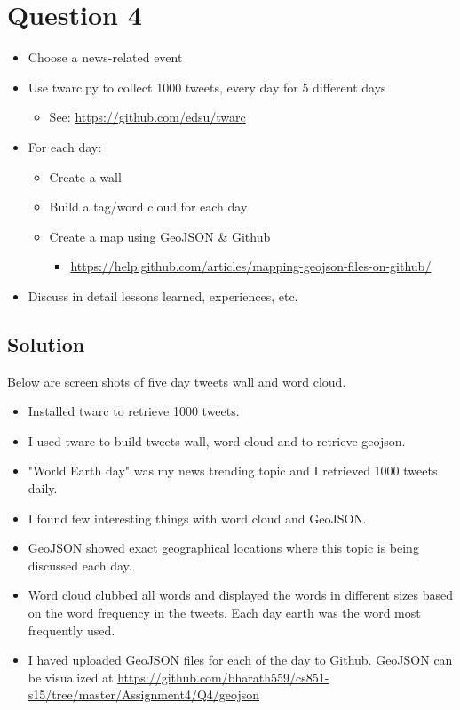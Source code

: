 


\section{Question 4}
\label{part1}

\begin{itemize}
\item Choose a news-related event
\item Use twarc.py to collect 1000 tweets, every day for 5 different days
\begin{itemize}
\item See: \url {https://github.com/edsu/twarc}
\end{itemize}
\item For each day:
\begin{itemize}
\item Create a wall
\item Build a tag/word cloud for each day
\item Create a map using GeoJSON \& Github
\begin{itemize}
\item \url {https://help.github.com/articles/mapping-geojson-files-on-github/} 
\end{itemize}
\end{itemize}
\item Discuss in detail lessons learned, experiences, etc.
\end{itemize}
\subsection{Solution}

Below are screen shots of five day tweets wall and word cloud.


\begin{itemize}
	\item Installed twarc\cite{twarc} to retrieve 1000 tweets.
	\item I used twarc to build tweets wall, word cloud and to retrieve geojson.
	\item "World Earth day" was my news trending topic and I retrieved 1000 tweets daily.
	\item I found few interesting things with word cloud and GeoJSON. 
	\item GeoJSON showed exact geographical locations where this topic is being discussed each day.
	\item Word cloud clubbed all words and displayed the words in different sizes based on the word frequency in the tweets. Each day earth was the word most frequently used.
	\item I haved uploaded GeoJSON files for each of the day to Github. GeoJSON can be visualized at \url{https://github.com/bharath559/cs851-s15/tree/master/Assignment4/Q4/geojson} 
\end{itemize}


